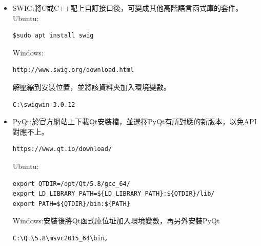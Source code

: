 \documentclass[14pt,a4paper]{report}  %
\begin{document}
{	\begin{itemize}
		\item SWIG:將C或C++配上自訂接口後，可變成其他高階語言函式庫的套件。
		\hspace*{\fill} \\
		Ubuntu:\\
		\begin{lstlisting}[caption=使用apt安裝]
$sudo apt install swig
		\end{lstlisting}
		Windows:\\
		\begin{lstlisting}[caption=下載新版SWIG]
http://www.swig.org/download.html
		\end{lstlisting}
		解壓縮到安裝位置，並將該資料夾加入環境變數。
		\begin{lstlisting}[caption=安裝位置]
C:\swigwin-3.0.12
		\end{lstlisting}
		\end{itemize}
		 
	\begin{itemize}
		\item PyQt:於官方網站上下載Qt安裝檔，並選擇PyQt有所對應的新版本，以免API對應不上。
		\begin{lstlisting}[caption=下載Qt檔]
https://www.qt.io/download/
		\end{lstlisting}
		Ubuntu:\\
		\begin{lstlisting}[caption=安裝後將Qt函式庫位址加入~/.bashrc環境變數]
export QTDIR=/opt/Qt/5.8/gcc_64/
export LD_LIBRARY_PATH=${LD_LIBRARY_PATH}:${QTDIR}/lib/
export PATH=${QTDIR}/bin:${PATH}
		\end{lstlisting}
		Windows:安裝後將Qt函式庫位址加入環境變數，再另外安裝PyQt\\
		\begin{lstlisting}[caption=Qt函式庫位址加入環境變數]
C:\Qt\5.8\msvc2015_64\bin。
		\end{lstlisting}
		\end{itemize}       
      
}
\end{document}
